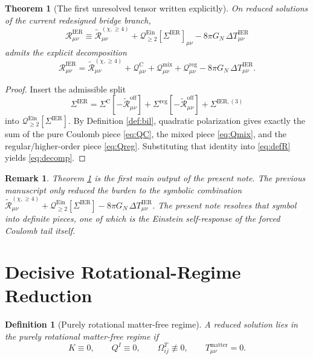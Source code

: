 \documentclass[11pt]{article}
\newcommand{\SigmaIER}{\Sigma^{\mathrm{IER}}}
\newcommand{\SigmaLongThree}{\Sigma^{\mathrm{IER},(3)}}
\newcommand{\SigmaC}{\Sigma^{\mathrm{C}}}
\newcommand{\SigmaReg}{\Sigma^{\mathrm{reg}}}
\newcommand{\ReOff}{\widetilde{\mathcal R}_{\mu\nu}^{\mathrm{off}}}
\newcommand{\ReLongFour}{\widetilde{\mathcal R}_{\mu\nu}^{(\chi,\ge 4)}}
\newcommand{\DeltaTIER}{\Delta T_{\mu\nu}^{\mathrm{IER}}}
\newcommand{\EinQuad}{\mathcal Q_{\ge 2}^{\mathrm{Ein}}}
\newtheorem{definition}{Definition}
\newtheorem{remark}{Remark}
\newtheorem{theorem}{Theorem}
\begin{document}
\begin{theorem}[The first unresolved tensor written explicitly]
\label{thm:decomp}
On reduced solutions of the current redesigned bridge branch,
\begin{equation}
\mathcal R_{\mu\nu}^{\mathrm{IER}}
\equiv
\ReLongFour+\EinQuad[\SigmaIER]_{\mu\nu}-8\pi G_N\,\DeltaTIER
\label{eq:defR}
\end{equation}
admits the explicit decomposition
\begin{equation}
\mathcal R_{\mu\nu}^{\mathrm{IER}}
=
\ReLongFour
+\mathcal Q_{\mu\nu}^{\mathrm C}
+\mathcal Q_{\mu\nu}^{\mathrm{mix}}
+\mathcal Q_{\mu\nu}^{\mathrm{reg}}
-8\pi G_N\,\DeltaTIER.
\label{eq:decomp}
\end{equation}
\end{theorem}

\begin{proof}
Insert the admissible split
\[
\SigmaIER=\SigmaC[-\ReOff]+\SigmaReg[-\ReOff]+\SigmaLongThree
\]
into \(\EinQuad[\SigmaIER]\). By Definition \ref{def:bil}, quadratic polarization gives exactly the sum of the pure Coulomb piece \eqref{eq:QC}, the mixed piece \eqref{eq:Qmix}, and the regular/higher-order piece \eqref{eq:Qreg}. Substituting that identity into \eqref{eq:defR} yields \eqref{eq:decomp}.
\end{proof}

\begin{remark}
Theorem \ref{thm:decomp} is the first main output of the present note. The previous manuscript only reduced the burden to the symbolic combination \(\ReLongFour+\EinQuad[\SigmaIER]-8\pi G_N\,\DeltaTIER\). The present note resolves that symbol into definite pieces, one of which is the Einstein self-response of the forced Coulomb tail itself.
\end{remark}

\section{Decisive Rotational-Regime Reduction}

\begin{definition}[Purely rotational matter-free regime]
\label{def:rot}
A reduced solution lies in the \emph{purely rotational matter-free regime} if
\begin{equation}
K\equiv0,
\qquad
Q^I\equiv0,
\qquad
\Omega_{ij}^T\not\equiv0,
\qquad
T_{\mu\nu}^{\mathrm{matter}}=0.
\label{eq:rot}
\end{equation}
\end{definition}
\end{document}
